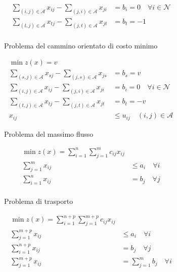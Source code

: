 \documentclass[\main/main.tex]{subfiles}
\begin{document}
\begin{figure}
\begin{subfigure}{0.31\textwidth}
\begin{align*}
			\sum_{(i,j) \in \mathcal{A}} x_{ij} - \sum_{(j,i) \in \mathcal{A}} x_{ji} & = b_i = 0 \quad \forall i \in \mathcal{N} \\
			\sum_{(t,j) \in \mathcal{A}} x_{tj} - \sum_{(j,t) \in \mathcal{A}} x_{jt} & = b_t = -1                                \\
		\end{align*}
		\caption{Problema del cammino orientato di costo minimo}
	\end{subfigure}
	\begin{subfigure}{0.31\textwidth}
		\begin{align*}
			\min z(x) = v                                                                                                         \\
			\sum_{(s,j) \in \mathcal{A}} x_{sj} - \sum_{(j,s) \in \mathcal{A}} x_{js} & = b_s =v                                  \\
			\sum_{(i,j) \in \mathcal{A}} x_{ij} - \sum_{(j,i) \in \mathcal{A}} x_{ji} & = b_i = 0 \quad \forall i \in \mathcal{N} \\
			\sum_{(t,j) \in \mathcal{A}} x_{tj} - \sum_{(j,t) \in \mathcal{A}} x_{jt} & = b_t = -v                                \\
			x_{ij}                                                                    & \leq u_{ij} \quad (i,j) \in \mathcal{A}
		\end{align*}
		\caption{Problema del massimo flusso}
	\end{subfigure}
	\begin{subfigure}{0.31\textwidth}
		\begin{align*}
			\min z(x) = \sum_{i=1}^n\sum_{j=1}^m c_{ij}x_{ij} \\
			\sum_{j=1}^m x_{ij} & \leq a_i \quad \forall i    \\
			\sum_{i=1}^n x_{ij} & = b_j  \quad \forall j      \\
		\end{align*}
		\caption{Problema di trasporto}
	\end{subfigure}
	\begin{subfigure}{0.45\textwidth}
		\begin{align*}
			\min z(x) = \sum_{i=1}^{n+p}\sum_{j=1}^{m+p} c_{ij}x_{ij}       \\
			\sum_{j=1}^{m+p} x_{ij} & \leq a_i \quad \forall i              \\
			\sum_{i=1}^{n+p} x_{ij} & = b_j    \quad \forall j              \\
			\sum_{j=1}^{m+p} x_{ij} & = \sum_{j=1}^m b_j    \quad \forall i \\

\end{align*}
\end{subfigure}
\end{figure}
\end{document}
